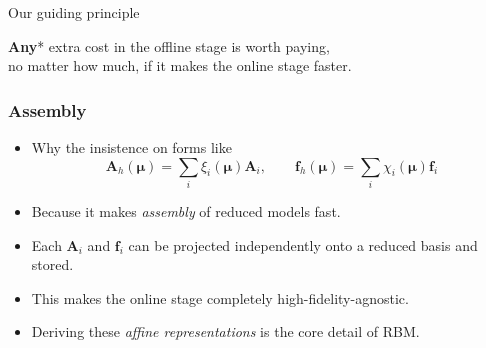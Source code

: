 \documentclass{beamer}
\begin{document}
\begin{frame}
\begin{center}
  \end{center}
\end{frame}

\begin{frame}
  \begin{block}{\centering Our guiding principle}
    \begin{center}
      \vspace{5mm}
      \textbf{Any}* extra cost in the offline stage is worth paying, \\
      no matter how much, if it makes the online stage faster.
      \vspace{5mm}
    \end{center}
  \end{block}
\end{frame}

\begin{frame}
  \frametitle{Assembly}

  \begin{itemize}
  \item Why the insistence on forms like
    \[
      \bm A_h(\bm \mu) = \textstyle \sum_i \xi_i(\bm \mu) \bm A_i, \qquad
      \bm f_h(\bm \mu) = \textstyle \sum_i \chi_i(\bm \mu) \bm f_i
    \]
  \item Because it makes \emph{assembly} of reduced models fast.
  \item Each $\bm A_i$ and $\bm f_i$ can be projected independently onto a reduced basis and stored.
  \item This makes the online stage completely high-fidelity-agnostic.
  \item Deriving these \emph{affine representations} is the core detail of RBM.
  \end{itemize}
\end{frame}
\end{document}
